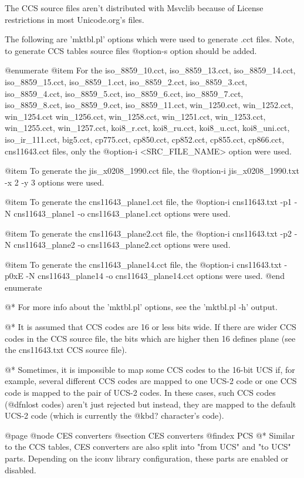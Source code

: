 The CCS source files aren't distributed with Msvclib because of License
restrictions in most Unicode.org's files.

The following are 'mktbl.pl' options which were used to generate .cct
files. Note, to generate CCS tables source files @option{-s} option
should be added.

@enumerate
@item For the iso_8859_10.cct, iso_8859_13.cct, iso_8859_14.cct, iso_8859_15.cct,
iso_8859_1.cct, iso_8859_2.cct, iso_8859_3.cct, iso_8859_4.cct,
iso_8859_5.cct, iso_8859_6.cct, iso_8859_7.cct, iso_8859_8.cct,
iso_8859_9.cct, iso_8859_11.cct, win_1250.cct, win_1252.cct, win_1254.cct
win_1256.cct, win_1258.cct, win_1251.cct,
win_1253.cct, win_1255.cct, win_1257.cct,
koi8_r.cct, koi8_ru.cct, koi8_u.cct, koi8_uni.cct, iso_ir_111.cct,
big5.cct, cp775.cct, cp850.cct, cp852.cct, cp855.cct, cp866.cct, cns11643.cct
files, only the @option{-i <SRC_FILE_NAME>} option were used.

@item To generate the jis_x0208_1990.cct file, the
@option{-i jis_x0208_1990.txt -x 2 -y 3} options were used.

@item To generate the cns11643_plane1.cct file, the
@option{-i cns11643.txt -p1 -N cns11643_plane1  -o cns11643_plane1.cct}
options were used.

@item To generate the cns11643_plane2.cct file, the
@option{-i cns11643.txt -p2 -N cns11643_plane2  -o cns11643_plane2.cct}
options were used.

@item To generate the cns11643_plane14.cct file, the
@option{-i cns11643.txt -p0xE -N cns11643_plane14  -o cns11643_plane14.cct}
options were used.
@end enumerate

@*
For more info about the 'mktbl.pl' options, see the 'mktbl.pl -h' output.

@*
It is assumed that CCS codes are 16 or less bits wide. If there are wider CCS codes
in the CCS source file, the bits which are higher then 16 defines plane (see the
cns11643.txt CCS source file).

@*
Sometimes, it is impossible to map some CCS codes to the 16-bit UCS if, for example,
several different CCS codes are mapped to one UCS-2 code or one CCS code is mapped to
the pair of UCS-2 codes. In these cases, such CCS codes (@dfn{lost
codes}) aren't just rejected but instead, they are mapped to the default
UCS-2 code (which is currently the @kbd{?} character's code).





@page
@node CES converters
@section CES converters
@findex PCS
@*
Similar to the CCS tables, CES converters are also split into "from UCS"
and "to UCS" parts. Depending on the iconv library configuration, these
parts are enabled or disabled. 

